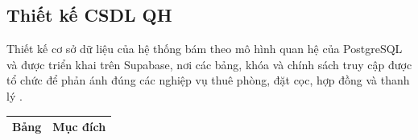 \subsection{Thiết kế CSDL QH}
\label{sec:db-script-migration}

Thiết kế cơ sở dữ liệu của hệ thống bám theo mô hình quan hệ của PostgreSQL và
được triển khai trên Supabase, nơi các bảng, khóa và chính sách truy cập được tổ
chức để phản ánh đúng các nghiệp vụ thuê phòng, đặt cọc, hợp đồng và thanh lý
\cite{supabase_docs,postgresql_docs}.

\begingroup
\small
\setlength{\LTleft}{0pt}
\setlength{\LTright}{0pt}
\begin{longtable}{|p{5.0cm}|p{10.0cm}|}
\hline
\textbf{Bảng} & \textbf{Mục đích} \\
\hline
\endfirsthead



\end{longtable}
